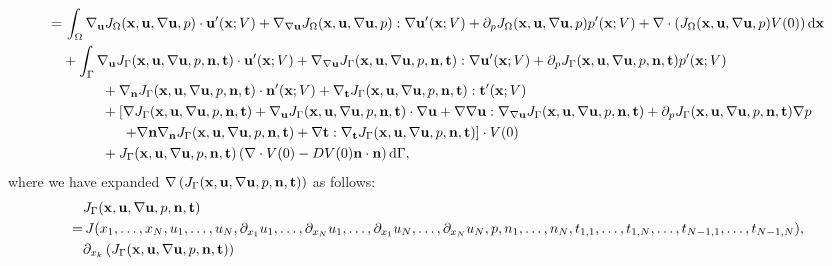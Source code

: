 \documentclass[oneside,11pt]{book}
\numberwithin{equation}{section}
\begin{document}
\begin{enumerate}[leftmargin=0in]
\begin{align*}
        =&\, \int_\Omega \nabla_{\bf u}J_\Omega({\bf x},{\bf u},\nabla{\bf u},p)\cdot{\bf u}'({\bf x};V) + \nabla_{\nabla{\bf u}}J_\Omega({\bf x},{\bf u},\nabla{\bf u},p):\nabla{\bf u}'({\bf x};V) + \partial_pJ_\Omega({\bf x},{\bf u},\nabla{\bf u},p)p'({\bf x};V) + \nabla\cdot\left(J_\Omega({\bf x},{\bf u},\nabla{\bf u},p)V(0)\right){\rm d}{\bf x}\\
        &+ \int_\Gamma \nabla_{\bf u}J_\Gamma({\bf x},{\bf u},\nabla{\bf u},p,{\bf n},{\bf t})\cdot{\bf u}'({\bf x};V) + \nabla_{\nabla{\bf u}}J_\Gamma({\bf x},{\bf u},\nabla{\bf u},p,{\bf n},{\bf t}):\nabla{\bf u}'({\bf x};V) + \partial_pJ_\Gamma({\bf x},{\bf u},\nabla{\bf u},p,{\bf n},{\bf t})p'({\bf x};V)\\
        &\hspace{1cm}+ \nabla_{\bf n}J_\Gamma({\bf x},{\bf u},\nabla{\bf u},p,{\bf n},{\bf t})\cdot{\bf n}'({\bf x};V) + \nabla_{\bf t}J_\Gamma({\bf x},{\bf u},\nabla{\bf u},p,{\bf n},{\bf t}):{\bf t}'({\bf x};V)\\
        &\hspace{1cm}+ \left[\nabla J_\Gamma({\bf x},{\bf u},\nabla{\bf u},p,{\bf n},{\bf t}) + \nabla_{\bf u}J_\Gamma({\bf x},{\bf u},\nabla{\bf u},p,{\bf n},{\bf t})\cdot\nabla{\bf u} + \nabla\nabla{\bf u}:\nabla_{\nabla{\bf u}}J_\Gamma({\bf x},{\bf u},\nabla{\bf u},p,{\bf n},{\bf t}) + \partial_pJ_\Gamma({\bf x},{\bf u},\nabla{\bf u},p,{\bf n},{\bf t})\nabla p\right.\\
        &\hspace{15mm} \left.+ \nabla{\bf n}\nabla_{\bf n}J_\Gamma({\bf x},{\bf u},\nabla{\bf u},p,{\bf n},{\bf t}) + \nabla{\bf t}:\nabla_{\bf t}J_\Gamma({\bf x},{\bf u},\nabla{\bf u},p,{\bf n},{\bf t})\right]\cdot V(0)\\
        &\hspace{1cm}+ J_\Gamma({\bf x},{\bf u},\nabla{\bf u},p,{\bf n},{\bf t})\left(\nabla\cdot V(0) - DV(0){\bf n}\cdot{\bf n}\right){\rm d}\Gamma,
    \end{align*}
    where we have expanded $\nabla\left(J_\Gamma({\bf x},{\bf u},\nabla{\bf u},p,{\bf n},{\bf t})\right)$ as follows:
    \begin{align*}
        &J_\Gamma({\bf x},{\bf u},\nabla{\bf u},p,{\bf n},{\bf t})\\
        =&\, J(x_1,\ldots,x_N,u_1,\ldots,u_N,\partial_{x_1}u_1,\ldots,\partial_{x_N}u_1,\ldots,\partial_{x_1}u_N,\ldots,\partial_{x_N}u_N,p,n_1,\ldots,n_N,t_{1,1},\ldots,t_{1,N},\ldots,t_{N-1,1},\ldots,t_{N-1,N}),\\
        &\partial_{x_k}\left(J_\Gamma({\bf x},{\bf u},\nabla{\bf u},p,{\bf n},{\bf t})\right)\\

\end{align*}
\end{enumerate}
\end{document}
